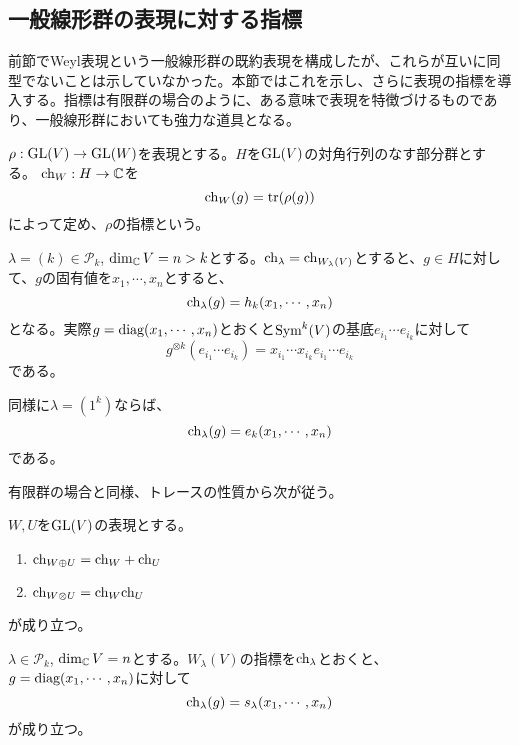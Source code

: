 \documentclass{ltjsreport}
\begin{document}
\subsection{一般線形群の表現に対する指標}

前節でWeyl表現という一般線形群の既約表現を構成したが、これらが互いに同型でないことは示していなかった。本節ではこれを示し、さらに表現の指標を導入する。指標は有限群の場合のように、ある意味で表現を特徴づけるものであり、一般線形群においても強力な道具となる。

\begin{defin}
  $\rho:\text{GL}(V)\rightarrow \text{GL}(W)$を表現とする。$H$を$\text{GL}(V)$の対角行列のなす部分群とする。
  $\text{ch}_W:H\rightarrow \mathbb{C}$を
  \[
  \text{ch}_W(g)=\text{tr}(\rho(g))  
  \]
  によって定め、$\rho$の指標という。
\end{defin}

\begin{eg}
  $\lambda=(k)\in\mathcal{P}_k$, $\dim_{\mathbb{C}} V=n>k$とする。$\text{ch}_\lambda=\text{ch}_{W_\lambda(V)}$とすると、$g\in H$に対して、$g$の固有値を$x_1,\cdots,x_n$とすると、
  \[
  \text{ch}_\lambda(g)=h_k(x_1,\cdots,x_n) 
  \]
  となる。実際$g=\text{diag}(x_1,\cdots,x_n)$とおくと$\text{Sym}^k(V)$の基底$e_{i_1}\cdots e_{i_k}$に対して
  \[
  g^{\otimes k}(e_{i_1}\cdots e_{i_k})=x_{i_1}\cdots x_{i_k}e_{i_1}\cdots e_{i_k}  
  \]
  である。
\end{eg}

\begin{eg}
  同様に$\lambda=(1^k)$ならば、
  \[
  \text{ch}_\lambda(g)=e_k(x_1,\cdots,x_n)  
  \]
  である。
\end{eg}

有限群の場合と同様、トレースの性質から次が従う。

\begin{prop}$W,U$を$\text{GL}(V)$の表現とする。
  \begin{enumerate}
    \item $\text{ch}_{W\oplus U}=\text{ch}_W+\text{ch}_U$
    \item $\text{ch}_{W\otimes U}=\text{ch}_W\text{ch}_U$
  \end{enumerate}
  が成り立つ。
\end{prop}

\begin{theo}\label{char_schur}
  $\lambda\in\mathcal{P}_k$, $\dim_{\mathbb{C}} V=n$とする。$W_\lambda(V)$の指標を$\text{ch}_\lambda$とおくと、$g=\text{diag}(x_1,\cdots,x_n)$に対して
  \[
  \text{ch}_\lambda(g)=s_\lambda(x_1,\cdots,x_n)
  \]
  が成り立つ。
\end{theo}
\end{document}
